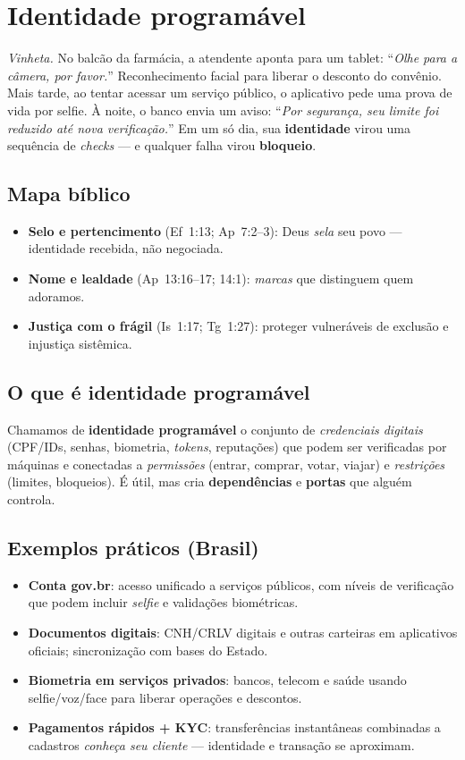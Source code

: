 \chapter{Identidade programável}
\noindent\textit{Vinheta.} No balcão da farmácia, a atendente aponta para um tablet: ``\emph{Olhe para a câmera, por favor.}'' Reconhecimento facial para liberar o desconto do convênio. Mais tarde, ao tentar acessar um serviço público, o aplicativo pede uma prova de vida por selfie. À noite, o banco envia um aviso: ``\emph{Por segurança, seu limite foi reduzido até nova verificação.}'' Em um só dia, sua \textbf{identidade} virou uma sequência de \emph{checks} --- e qualquer falha virou \textbf{bloqueio}.

\section{Mapa bíblico}
\begin{itemize}[leftmargin=*,noitemsep]
  \item \textbf{Selo e pertencimento} (Ef~1:13; Ap~7:2--3): Deus \emph{sela} seu povo --- identidade recebida, não negociada.
  \item \textbf{Nome e lealdade} (Ap~13:16--17; 14:1): \emph{marcas} que distinguem quem adoramos.
  \item \textbf{Justiça com o frágil} (Is~1:17; Tg~1:27): proteger vulneráveis de exclusão e injustiça sistêmica.
\end{itemize}

\section{O que é identidade programável}
Chamamos de \textbf{identidade programável} o conjunto de \emph{credenciais digitais} (CPF/IDs, senhas, biometria, \emph{tokens}, reputações) que podem ser verificadas por máquinas e conectadas a \emph{permissões} (entrar, comprar, votar, viajar) e \emph{restrições} (limites, bloqueios). É útil, mas cria \textbf{dependências} e \textbf{portas} que alguém controla.

\section{Exemplos práticos (Brasil)}
\begin{itemize}[leftmargin=*,noitemsep]
  \item \textbf{Conta gov.br}: acesso unificado a serviços públicos, com níveis de verificação que podem incluir \emph{selfie} e validações biométricas.
  \item \textbf{Documentos digitais}: CNH/CRLV digitais e outras carteiras em aplicativos oficiais; sincronização com bases do Estado.
  \item \textbf{Biometria em serviços privados}: bancos, telecom e saúde usando selfie/voz/face para liberar operações e descontos.
  \item \textbf{Pagamentos rápidos + KYC}: transferências instantâneas combinadas a cadastros \emph{conheça seu cliente} --- identidade e transação se aproximam.
\end{itemize}

